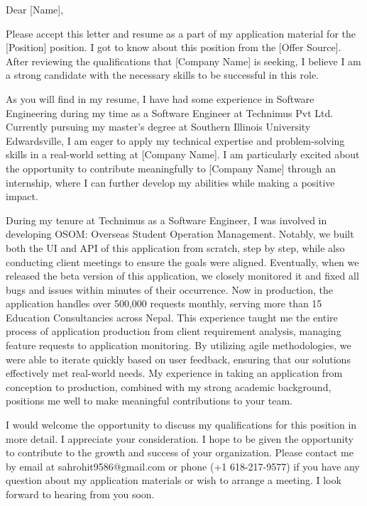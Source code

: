 
Dear [Name],

Please accept this letter and resume as a part of my application material for the [Position] position. I got to know about this position from the [Offer Source]. After reviewing the qualifications that [Company Name] is seeking, I believe I am a strong candidate with the necessary skills to be successful in this role.

As you will find in my resume, I have had some experience in Software Engineering during my time as a Software Engineer at Technimus Pvt Ltd. Currently pursuing my master's degree at Southern Illinois University Edwardsville, I am eager to apply my technical expertise and problem-solving skills in a real-world setting at [Company Name]. I am particularly excited about the opportunity to contribute meaningfully to [Company Name] through an internship, where I can further develop my abilities while making a positive impact.

During my tenure at Technimus as a Software Engineer, I was involved in developing OSOM: Overseas Student Operation Management. Notably, we built both the UI and API of this application from scratch, step by step, while also conducting client meetings to ensure the goals were aligned. Eventually, when we released the beta version of this application, we closely monitored it and fixed all bugs and issues within minutes of their occurrence. Now in production, the application handles over 500,000 requests monthly, serving more than 15 Education Consultancies across Nepal. This experience taught me the entire process of application production from client requirement analysis, managing feature requests to application monitoring. By utilizing agile methodologies, we were able to iterate quickly based on user feedback, ensuring that our solutions effectively met real-world needs. My experience in taking an application from conception to production, combined with my strong academic background, positions me well to make meaningful contributions to your team.

I would welcome the opportunity to discuss my qualifications for this position in more detail. I appreciate your consideration. I hope to be given the opportunity to contribute to the growth and success of your organization. Please contact me by email at sahrohit9586@gmail.com or phone (+1 618-217-9577) if you have any question about my application materials or wish to arrange a meeting. I look forward to hearing from you soon.